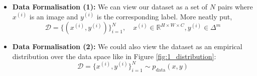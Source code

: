 \begin{enumerate}
\begin{itemize}[noitemsep]
              \item \textbf{Data Formalisation (1): }We can view our dataset as a set of $N$ pairs where $x^{(i)}$ is an image and $y^{(i)}$ is the corresponding label. More neatly put,
                    \begin{equation}
                        \mathcal{D} = \{(x^{(i)}, y^{(i)})\}_{i=1}^{N}, \quad x^{(i)} \in \mathbb{R}^{H \times W \times C}, y^{(i)} \in \Delta^m
                    \end{equation}
              \item \textbf{Data Formalisation (2): } We could also view the dataset as an empirical distribution over the data space like in Figure \ref{fig:1_distribution}:
                    \begin{equation}
                        \mathcal{D} = \{x^{(i)}, y^{(i)}\}_{i=1}^{N} \sim p_{\text{data}}(x, y)
                    \end{equation}
                    \begin{marginfigure}
                        \centering
\end{marginfigure}
\end{itemize}
\end{enumerate}
